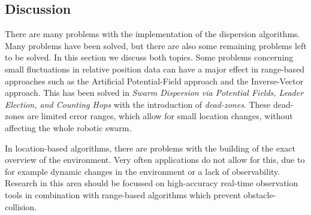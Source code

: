 \subsection{Discussion}
There are many problems with the implementation of the dispersion algorithms. Many problems have been solved, but there are also some remaining problems left to be solved. In this section we discuss both topics.
Some problems concerning small fluctuations in relative position data can have a major effect in range-based approaches such as the Artificial Potential-Field approach and the Inverse-Vector approach. This has been solved in \emph{Swarm Dispersion via Potential Fields, Leader Election, and Counting Hops} with the introduction of \emph{dead-zones}. These dead-zones are limited error ranges, which allow for small location changes, without affecting the whole robotic swarm.

In location-based algorithms, there are problems with the building of the exact overview of the environment. Very often applications do not allow for this, due to for example dynamic changes in the environment or a lack of observability. Research in this area should be focussed on high-accuracy real-time observation tools in combination with range-based algorithms which prevent obstacle-collision. 
